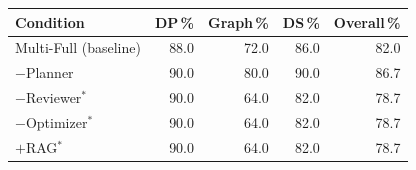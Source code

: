 \begin{tabular}{@{}lrrrr@{}}
\toprule
Condition & DP\,\% & Graph\,\% & DS\,\% & Overall\,\% \\
\midrule
Multi-Full (baseline) & 88.0 & 72.0 & 86.0 & 82.0 \\
$-$Planner & 90.0 & 80.0 & 90.0 & 86.7 \\
$-$Reviewer$^{\ast}$ & 90.0 & 64.0 & 82.0 & 78.7 \\
$-$Optimizer$^{\ast}$ & 90.0 & 64.0 & 82.0 & 78.7 \\
$+$RAG$^{\ast}$ & 90.0 & 64.0 & 82.0 & 78.7 \\
\bottomrule
\end{tabular}
